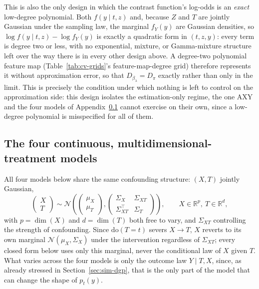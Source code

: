 \documentclass[11pt]{article}
\theoremstyle{plain}
\theoremstyle{definition}
\theoremstyle{remark}
\newcommand{\R}{\mathbb{R}}
\newcommand{\ratio}{\ensuremath{\pi}}
\newcommand{\contrast}{D_{\ratio}}
\begin{document}
This is also the only design in which the contrast function's log-odds is an \emph{exact} low-degree
polynomial. Both $f(y\mid t,z)$ and, because $Z$ and $T$ are jointly Gaussian under the sampling
law, the marginal $f_Y(y)$ are Gaussian densities, so $\log f(y\mid t,z) - \log f_Y(y)$ is exactly a
quadratic form in $(t,z,y)$: every term is degree two or less, with no exponential, mixture, or
Gamma-mixture structure left over the way there is in every other design above. A degree-two
polynomial feature map (Table~\ref{tab:cv-grids}'s feature-map-degree grid) therefore represents it
without approximation error, so that $D_{\beta_\lambda} = \contrast$ exactly rather than only in the
limit. This is precisely the condition under which nothing is left to control on the
approximation side: this design isolates the estimation-only regime, the one AXY and the four
models of Appendix~\ref{app:dgp-continuous} cannot exercise on their own, since a low-degree
polynomial is misspecified for all of them.

\subsection{The four continuous, multidimensional-treatment models}
\label{app:dgp-continuous}

All four models below share the same confounding structure: $(X,T)$ jointly Gaussian,
\begin{equation}
\begin{pmatrix} X \\ T \end{pmatrix} \sim
\mathcal{N}\!\left( \begin{pmatrix} \mu_X \\ \mu_T \end{pmatrix},
\begin{pmatrix} \Sigma_X & \Sigma_{XT} \\ \Sigma_{XT}^\top & \Sigma_T \end{pmatrix} \right),
\qquad X \in \R^{p}, \ T \in \R^{d},
\label{eq:app-confounding}
\end{equation}
with $p=\dim(X)$ and $d=\dim(T)$ both free to vary, and $\Sigma_{XT}$ controlling the strength of
confounding. Since $\mathrm{do}(T=t)$ severs $X \to T$, $X$ reverts to its own marginal
$\mathcal N(\mu_X,\Sigma_X)$ under the intervention regardless of $\Sigma_{XT}$; every closed form
below uses only this marginal, never the conditional law of $X$ given $T$. What varies across the
four models is only the outcome law $Y \mid T,X$, since, as already stressed in
Section~\ref{sec:sim-dgp}, that is the only part of the model that can change the shape of
$p_t(y)$.
\end{document}
